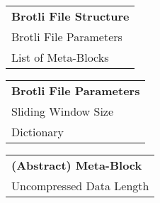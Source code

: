 \noindent
\begin{varwidth}[t]{\textwidth}
	\vspace{0pt}
	\centering
	
	\begin{tabular}[t]{l}
		\textbf{Brotli File Structure} \\
		\addlinespace
		\hline
		\addlinespace
		Brotli File Parameters \\
		List of Meta-Blocks \\
	\end{tabular}

\end{varwidth}%
\hspace{0.75cm}%
\begin{varwidth}[t]{\textwidth}
	\vspace{0pt}
	\centering
	
	\begin{tabular}[t]{l}
		\textbf{Brotli File Parameters} \\
		\addlinespace
		\hline
		\addlinespace
		Sliding Window Size \\
		Dictionary\footnotemark \\
	\end{tabular}

\end{varwidth}%
\hspace{0.75cm}%
\begin{varwidth}[t]{\textwidth}
	\vspace{0pt}
	\centering
	
	\begin{tabular}[t]{l}
		\textbf{(Abstract) Meta-Block} \\
		\addlinespace
		\hline
		\addlinespace
		Uncompressed Data Length \\
	\end{tabular}

\end{varwidth}
